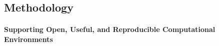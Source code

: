 
\subsection{Methodology}\label{sec:concept_methodology}

%
%
%
%

\paragraph*{Supporting Open, Useful, and Reproducible Computational
  Environments}\label{sec:SOURCE}

  \mbox{}\\

